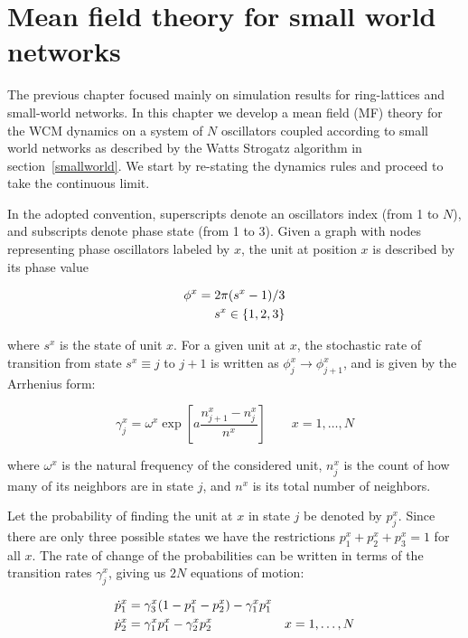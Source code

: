 \chapter{Mean field theory for small world networks}

The previous chapter focused mainly on simulation results for ring-lattices and small-world networks. In this chapter we develop a mean
field (MF) theory for the WCM dynamics on a system of $N$ oscillators coupled according to small world networks as described by the
Watts Strogatz algorithm in section~\ref{smallworld}. We start by re-stating the dynamics rules and proceed to take the continuous
limit.

In the adopted convention, superscripts denote an oscillators index (from 1 to $N$), and subscripts denote phase state (from 1 to 3).
Given a graph with nodes representing phase oscillators labeled by $x$, the unit at position $x$ is described by its phase value

\begin{align}
    \phi^x = 2\pi (s^x-1)/3 \\
    s^x \in \{1,2,3\} \notag
\end{align}

\noindent where $s^x$ is the state of unit $x$. For a given unit at $x$, the stochastic rate of transition from state $s^x\equiv j$ to
$j+1$ is written as $\phi^x_j \to \phi^x_{j+1}$, and is given by the Arrhenius form:

\begin{equation}
    \gamma^x_j = \omega^x\exp\left[ a\frac{n^x_{j+1} - n^x_j}{n^x} \right] \qquad x=1,\dots, N
    \label{rate}
\end{equation}

\noindent where $\omega^x$ is the natural frequency of the considered unit, $n^x_j$ is the count of how many of its neighbors are in
state $j$, and $n^x$ is its total number of neighbors.

Let the probability of finding the unit at $x$ in state $j$ be denoted by $p^x_j$. Since there are only three possible states we have
the restrictions $p^x_1+p^x_2+p^x_3=1$ for all $x$. The rate of change of the probabilities can be written in terms of the transition
rates $\gamma^x_j$, giving us $2N$ equations of motion:

\begin{align}
    \dot{p}^x_1 &= \gamma^x_3(1 - p^x_1 - p^x_2) - \gamma^x_1 p^x_1 & \notag\\
    \dot{p}^x_2 &= \gamma^x_1p^x_1 - \gamma^x_2 p^x_2 &x=1,\dots,N
    \label{eqmotion}
\end{align}

